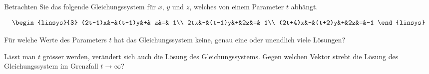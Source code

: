 Betrachten Sie das folgende Gleichungssystem für $x$, $y$ und $z$, 
welches von einem Parameter $t$ abhängt.

\[
\begin{linsys}{3}
(2t-1)x&-&(t-1)y&+& z&=& 1\\
    2tx&-&(t-1)y&+&2z&=& 1\\
(2t+4)x&-&(t+2)y&+&2z&=&-1
\end{linsys}
\]
\begin{teilaufgaben}
\item
Für welche Werte des Parameters $t$ hat das Gleichungssystem
keine, genau eine oder unendlich viele Lösungen?
\item
Lässt man $t$ grösser werden, verändert sich auch die Lösung
des Gleichungssystems. Gegen welchen Vektor strebt die Lösung
des Gleichungssystem im Grenzfall $t\to\infty$?
\end{teilaufgaben}

